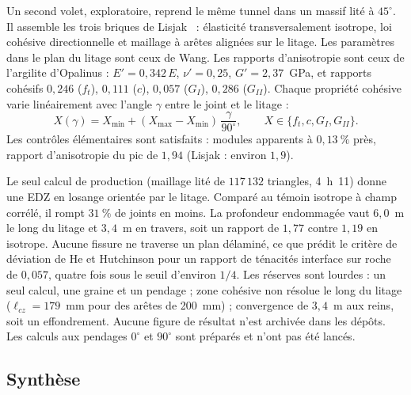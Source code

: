 Un second volet, exploratoire, reprend le même tunnel dans un massif lité à $45^\circ$. Il assemble les trois briques de Lisjak~\cite{lisjak2013thesis,lisjak2014shales} : élasticité transversalement isotrope, loi cohésive directionnelle et maillage à arêtes alignées sur le litage. Les paramètres dans le plan du litage sont ceux de Wang. Les rapports d'anisotropie sont ceux de l'argilite d'Opalinus : $E' = 0{,}342\,E$, $\nu' = 0{,}25$, $G' = 2{,}37$~GPa, et rapports cohésifs $0{,}246$ ($f_t$), $0{,}111$ ($c$), $0{,}057$ ($G_I$), $0{,}286$ ($G_{II}$). Chaque propriété cohésive varie linéairement avec l'angle $\gamma$ entre le joint et le litage :
\begin{equation}
X(\gamma) = X_\text{min} + (X_\text{max} - X_\text{min})\,\frac{\gamma}{90^\circ}, \qquad X \in \{f_t, c, G_I, G_{II}\} .
\end{equation}
Les contrôles élémentaires sont satisfaits : modules apparents à $0{,}13~\%$ près, rapport d'anisotropie du pic de $1{,}94$ (Lisjak : environ $1{,}9$).

Le seul calcul de production (maillage lité de $117\,132$ triangles, 4~h~11) donne une EDZ en losange orientée par le litage. Comparé au témoin isotrope à champ corrélé, il rompt $31~\%$ de joints en moins. La profondeur endommagée vaut $6{,}0$~m le long du litage et $3{,}4$~m en travers, soit un rapport de $1{,}77$ contre $1{,}19$ en isotrope. Aucune fissure ne traverse un plan délaminé, ce que prédit le critère de déviation de He et Hutchinson pour un rapport de ténacités interface sur roche de $0{,}057$, quatre fois sous le seuil d'environ $1/4$. Les réserves sont lourdes : un seul calcul, une graine et un pendage ; zone cohésive non résolue le long du litage ($\ell_{cz} = 179$~mm pour des arêtes de 200~mm) ; convergence de $3{,}4$~m aux reins, soit un effondrement. Aucune figure de résultat n'est archivée dans les dépôts. Les calculs aux pendages $0^\circ$ et $90^\circ$ sont préparés et n'ont pas été lancés.

\subsection{Synthèse}

